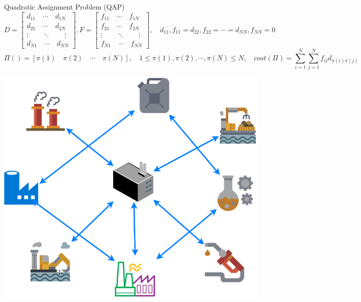 \documentclass{beamer}
\begin{document}
\begin{frame}[t]{Quadratic Assignment Problem (QAP)} %
\tiny
\begin{equation}
D=
\left[ \begin{array}{ll}
d_{11} \quad \cdots \quad d_{1N}\\
d_{21} \quad \cdots \quad d_{2N}\\
\vdots  \quad \quad \ddots \quad \quad \vdots\\
d_{N1}  \quad \cdots \quad d_{NN}
\end{array} \right],
F=
\left[ \begin{array}{ll}
f_{11} \quad \cdots \quad f_{1N}\\
f_{21} \quad \cdots \quad f_{2N}\\
\vdots  \quad \quad \ddots \quad \quad \vdots\\
f_{N1}  \quad \cdots \quad f_{NN}
\end{array} \right], \quad
d_{11},f_{11}=d_{22},f_{22}=\cdots=d_{NN},f_{NN}=0
\end{equation}
\begin{equation}
\Pi()=[\pi(1) \quad \pi(2) \quad \cdots \quad \pi(N)], \quad
1 \leq \pi(1),\pi(2),\cdots,\pi(N) \leq N, \quad
cost(\Pi)=\sum_{i=1}^{N}\sum_{j=1}^{N}f_{ij}d_{\pi(i)\pi(j)}
\end{equation}
\begin{center}
\includegraphics[scale=0.3]{Fac}
\end{center}
\end{frame}
\end{document}
